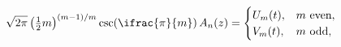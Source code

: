 \[\sqrt{2\pi}\left(\tfrac{1}{2}m\right)^{(m-1)/m}\mathop{\csc\/}\nolimits\!\left%
(\ifrac{\pi}{m}\right)\mathop{A_{n}\/}\nolimits\!\left(z\right)=\begin{cases}U%
_{m}(t),&m\text{ even},\\
V_{m}(t),&m\text{ odd},\end{cases}\]